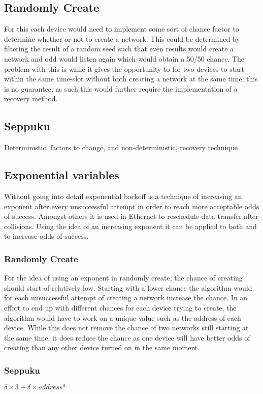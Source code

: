 \subsection{Randomly Create}\label{RCreate}
For this each device would need to implement some sort of chance factor to determine whether or not to create a network.
This could be determined by filtering the result of a random seed such that even results would create a network and odd would listen again which would obtain a 50/50 chance.
The problem with this is while it gives the opportunity to for two devices to start within the same time-slot without both creating a network at the same time, this is no guarantee; as such this would further require the implementation of a recovery method.

\subsection{Seppuku}\label{KtN}
Deterministic, factors to change, and non-deterministic, recovery technique


\subsection{Exponential variables}
Without going into detail exponential backoff is a technique of increasing an exponent after every unsuccessful attempt in order to reach more acceptable odds of success.
Amongst others it is used in Ethernet to reschedule data transfer after collisions. \citep{Ebackoff}
Using the idea of an increasing exponent it can be applied to both  and  to increase odds of success.
\subsubsection*{Randomly Create}
For the idea of using an exponent in randomly create, the chance of creating should start of relatively low.
Starting with a lower chance the algorithm would for each unsuccessful attempt of creating a network increase the chance.
In an effort to end up with different chances for each device trying to create, the algorithm would have to work on a unique value such as the address of each device.
While this does not remove the chance of two networks still starting at the same time, it does reduce the chance as one device will have better odds of creating than any other device turned on in the same moment.
\subsubsection*{Seppuku}
 $\delta \times 3 + \delta \times address^a$

